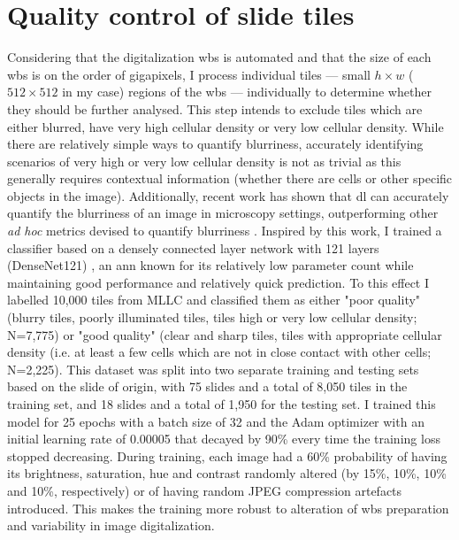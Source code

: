 \section{Quality control of slide tiles}

Considering that the digitalization \ac{wbs} is automated and that the size of each \ac{wbs} is on the order of gigapixels, I process individual tiles --- small $h \times w$ ($512 \times 512$ in my case) regions of the \ac{wbs} --- individually to determine whether they should be further analysed. This step intends to exclude tiles which are either blurred, have very high cellular density or very low cellular density. While there are relatively simple ways to quantify blurriness, accurately identifying scenarios of very high or very low cellular density is not as trivial as this generally requires contextual information (whether there are cells or other specific objects in the image). Additionally, recent work has shown that \ac{dl} can accurately quantify the blurriness of an image in microscopy settings, outperforming other \textit{ad hoc} metrics devised to quantify blurriness \cite{Yang2018-ve}. Inspired by this work, I trained a classifier based on a densely connected layer network with 121 layers (DenseNet121) \cite{huang2017densely}, an \ac{ann} known for its relatively low parameter count while maintaining good performance and relatively quick prediction. To this effect I labelled 10,000 tiles from MLLC and classified them as either "poor quality" (blurry tiles, poorly illuminated tiles, tiles high or very low cellular density; N=7,775) or "good quality" (clear and sharp tiles, tiles with appropriate cellular density (i.e. at least a few cells which are not in close contact with other cells; N=2,225). This dataset was split into two separate training and testing sets based on the slide of origin, with 75 slides and a total of 8,050 tiles in the training set, and 18 slides and a total of 1,950 for the testing set. I trained this model for 25 epochs with a batch size of 32 and the Adam optimizer with an initial learning rate of 0.00005 that decayed by 90\% every time the training loss stopped decreasing. During training, each image had a 60\% probability of having its brightness, saturation, hue and contrast randomly altered (by 15\%, 10\%, 10\% and 10\%, respectively) or of having random JPEG compression artefacts introduced. This makes the training more robust to alteration of \ac{wbs} preparation and variability in image digitalization.

